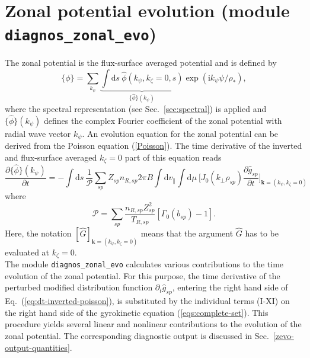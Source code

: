 \pagebreak

\section{Zonal potential evolution (module \texttt{diagnos\_zonal\_evo})}
\label{zonal-potential-evolution}

The zonal potential is the flux-surface averaged potential and is defined by
\begin{equation}
\{\phi \} = \sum_{k_\psi} \underbrace{ \int \mathrm{d}s~\hat \phi (k_\psi, k_\zeta=0,s) }_{\{\hat \phi \}(k_\psi)} \exp(\mathrm{i} k_\psi \psi / \rho_\ast),
\end{equation}
where the spectral representation (see Sec.~\ref{sec:spectral}) is applied and $\{\hat \phi \}(k_\psi)$ defines the complex Fourier coefficient of the zonal potential with radial wave vector $k_\psi$. 
An evolution equation for the zonal potential can be derived from the Poisson equation (\ref{Poisson}).
The time derivative of the inverted and flux-surface averaged $k_\zeta = 0$ part of this equation reads
\begin{equation}
\label{eq:dt-inverted-poisson}
\frac{\partial \{ \hat \phi \}(k_\psi)}{\partial t} = -\int \mathrm{d} s ~ \frac{1}{\mathcal{P}}  \sum_{sp} Z_{sp} n_{R,sp} 2 \pi B  \int \mathrm{d} v_{\parallel} \int \mathrm{d} \mu ~ \biggl[J_0(k_\perp\rho_{sp}) \frac{\partial \hat g_{sp}}{\partial t} \biggr]_{\mathbf{k}=(k_\psi,k_\zeta=0)}
\end{equation}
where
\begin{equation}
\mathcal{P} = \sum_{sp} \frac{n_{R,sp} Z_{sp}^2}{T_{R,sp}} [ \Gamma_0(b_{sp}) -1].
\end{equation}
Here, the notation $[ \hat G ]_{\mathbf{k}=(k_\psi,k_\zeta=0)}$ means that the argument $\hat G$ has to be evaluated at $k_\zeta = 0$. \\
The module \texttt{diagnos\_zonal\_evo} calculates various contributions to the time evolution of the zonal potential.
For this purpose, the time derivative of the perturbed modified distribution function $\partial_t \hat g_{sp}$, entering the right hand side of Eq.~(\ref{eq:dt-inverted-poisson}), is substituted by the individual terms (I-XI) on the right hand side of the gyrokinetic equation (\ref{eqs:complete-set}).
This procedure yields several linear and nonlinear contributions to the evolution of the zonal potential.
The corresponding diagnostic output is discussed in Sec.~\ref{zevo-output-quantities}.


